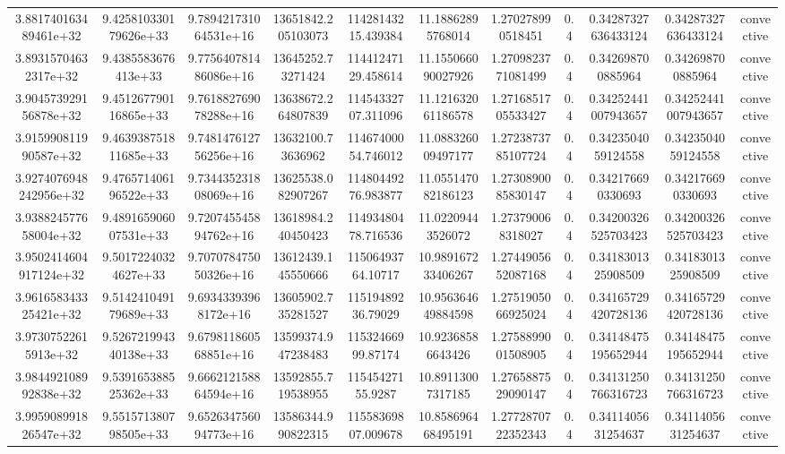 \begin{table}
\begin{tabular}{ccccccccccc}
3.881740163489461e+32 & 9.425810330179626e+33 & 9.789421731064531e+16 & 13651842.205103073 & 11428143215.439384 & 11.18862895768014 & 1.270278990518451 & 0.4 & 0.34287327636433124 & 0.34287327636433124 & convective \\
3.89315704632317e+32 & 9.4385583676413e+33 & 9.775640781486086e+16 & 13645252.73271424 & 11441247129.458614 & 11.155066090027926 & 1.2709823771081499 & 0.4 & 0.342698700885964 & 0.342698700885964 & convective \\
3.904573929156878e+32 & 9.451267790116865e+33 & 9.761882769078288e+16 & 13638672.264807839 & 11454332707.311096 & 11.121632061186578 & 1.2716851705533427 & 0.4 & 0.34252441007943657 & 0.34252441007943657 & convective \\
3.915990811990587e+32 & 9.463938751811685e+33 & 9.748147612756256e+16 & 13632100.73636962 & 11467400054.746012 & 11.088326009497177 & 1.2723873785107724 & 0.4 & 0.3423504059124558 & 0.3423504059124558 & convective \\
3.9274076948242956e+32 & 9.476571406196522e+33 & 9.734435231808069e+16 & 13625538.082907267 & 11480449276.983877 & 11.055147082186123 & 1.2730890085830147 & 0.4 & 0.342176690330693 & 0.342176690330693 & convective \\
3.938824577658004e+32 & 9.489165906007531e+33 & 9.720745545894762e+16 & 13618984.240450423 & 11493480478.716536 & 11.02209443526072 & 1.273790068318027 & 0.4 & 0.34200326525703423 & 0.34200326525703423 & convective \\
3.9502414604917124e+32 & 9.50172240324627e+33 & 9.707078475050326e+16 & 13612439.145550666 & 11506493764.10717 & 10.989167233406267 & 1.2744905652087168 & 0.4 & 0.3418301325908509 & 0.3418301325908509 & convective \\
3.961658343325421e+32 & 9.514241049179689e+33 & 9.69343393968172e+16 & 13605902.735281527 & 11519489236.79029 & 10.956364649884598 & 1.2751905066925024 & 0.4 & 0.34165729420728136 & 0.34165729420728136 & convective \\
3.97307522615913e+32 & 9.526721994340138e+33 & 9.679811860568851e+16 & 13599374.947238483 & 11532466999.87174 & 10.92368586643426 & 1.2758899001508905 & 0.4 & 0.34148475195652944 & 0.34148475195652944 & convective \\
3.984492108992838e+32 & 9.539165388525362e+33 & 9.666212158864594e+16 & 13592855.719538955 & 11545427155.9287 & 10.89113007317185 & 1.2765887529090147 & 0.4 & 0.34131250766316723 & 0.34131250766316723 & convective \\
3.995908991826547e+32 & 9.551571380798505e+33 & 9.652634756094773e+16 & 13586344.990822315 & 11558369807.009678 & 10.858696468495191 & 1.2772870722352343 & 0.4 & 0.3411405631254637 & 0.3411405631254637 & convective \\

\end{tabular}
\end{table}
